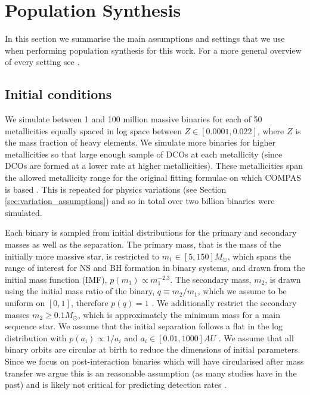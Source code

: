 \section{Population Synthesis}\label{app:pop_synth}

In this section we summarise the main assumptions and settings that we use when performing population synthesis for this work. For a more general overview of every setting see \citet{Broekgaarden+2021}.

\subsection{Initial conditions}

We simulate between 1 and 100 million massive binaries for each of 50 metallicities equally spaced in log space between $Z \in [0.0001, 0.022]$, where $Z$ is the mass fraction of heavy elements. We simulate more binaries for higher metallicities so that large enough sample of DCOs at each metallicity (since DCOs are formed at a lower rate at higher metallicities). These metallicities span the allowed metallicity range for the original fitting formulae on which COMPAS is based \citep{Hurley+2000}. This is repeated for \nMinusOneModels{} physics variations (see Section \ref{sec:variation_assumptions}) and so in total over two billion binaries were simulated.

Each binary is sampled from initial distributions for the primary and secondary masses as well as the separation. The primary mass, that is the mass of the initially more massive star, is restricted to $m_1 \in [5, 150] \unit{M_{\odot}}$, which spans the range of interest for NS and BH formation in binary systems, and drawn from the \citet{Kroupa+2001} initial mass function (IMF), $p(m_1) \propto m_1^{-2.3}$. The secondary mass, $m_2$, is drawn using the initial mass ratio of the binary, $q \equiv m_2 / m_1$, which we assume to be uniform on $[0, 1]$, therefore $p(q) = 1$ \citep[e.g.\ consistent with][]{Sana+2012}. We additionally restrict the secondary masses $m_2 \ge 0.1 \unit{M_{\odot}}$, which is approximately the minimum mass for a main sequence star. We assume that the initial separation follows a flat in the log distribution with $p(a_i) \propto 1 / a_i$ and $a_i \in [0.01, 1000] \unit{AU}$ \citep{Opik+1924, Abt+1983}. We assume that all binary orbits are circular at birth to reduce the dimensions of initial parameters. Since we focus on post-interaction binaries which will have circularised after mass transfer we argue this is an reasonable assumption (as many studies have in the past) and is likely not critical for predicting detection rates \citep{Hurley+2002, deMink+2015}.

